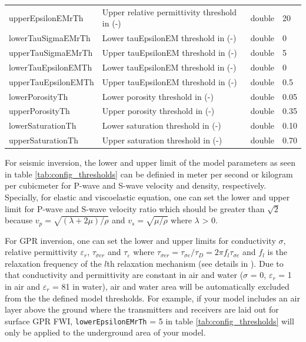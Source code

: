 \documentclass[pdftex,a4paper,parskip,listof=totoc,bibliography=totoc,onehalfspacing,12pt]{scrreprt}
\begin{document}
\begin{table}[h!]
\begin{adjustbox}{width=1\textwidth,center=\textwidth}
\begin{tabular}{llll}
         upperEpsilonEMrTh           & Upper relative permittivity threshold in (-)                 & double & 20 \\
         lowerTauSigmaEMrTh           & Lower tauEpsilonEM threshold in (-)                 & double & 0 \\
         upperTauSigmaEMrTh           & Upper tauEpsilonEM threshold in (-)                & double & 5 \\
         lowerTauEpsilonEMTh           & Lower tauEpsilonEM threshold in (-)                 & double & 0 \\
         upperTauEpsilonEMTh           & Upper tauEpsilonEM threshold in (-)                 & double & 0.5 \\
         lowerPorosityTh           & Lower porosity threshold in (-)                 & double & 0.05 \\
         upperPorosityTh           & Upper porosity threshold in (-)                 & double & 0.35 \\
         lowerSaturationTh           & Lower saturation threshold in (-)                 & double & 0.10 \\
         upperSaturationTh           & Upper saturation threshold in (-)                 & double & 0.70 \\
	\bottomrule
	\end{tabular}
	\end{adjustbox}
\end{table}
For seismic inversion, the lower and upper limit of the model parameters as seen in table \ref{tab:config_thresholds} can be definied in meter per second or kilogram per cubicmeter for P-wave and S-wave velocity and density, respectively. Specially, for elastic and viscoelastic equation, one can set the lower and upper limit for P-wave and S-wave velocity ratio which should be greater than $\sqrt{2}$ because $v_p=\sqrt{(\lambda+2\mu)/\rho}$ and $v_s=\sqrt{\mu/\rho}$ where $\lambda$ > 0.

For GPR inversion, one can set the lower and upper limits for conductivity $\sigma$, relative permittivity $\varepsilon_r$, $\tau_{\sigma e r}$ and $\tau_{\varepsilon}$ where $\tau_{\sigma e r}=\tau_{\sigma e}/\tau_{D}=2 \pi f_l \tau_{\sigma e}$ and $f_l$ is the relaxation frequency of the $l$th relaxation mechanism (see details in \cite{qin2020full}). Due to that conductivity and permittivity are constant in air and water ($\sigma$ = 0, $\varepsilon_r$ = 1 in air and $\varepsilon_r$ = 81 in water), air and water area will be automatically excluded from the the defined model thresholds. For example, if your model includes an air layer above the ground where the transmitters and receivers are laid out for surface GPR FWI, \verb+lowerEpsilonEMrTh+ = 5 in table \ref{tab:config_thresholds} will only be applied to the underground area of your model.
\end{document}
